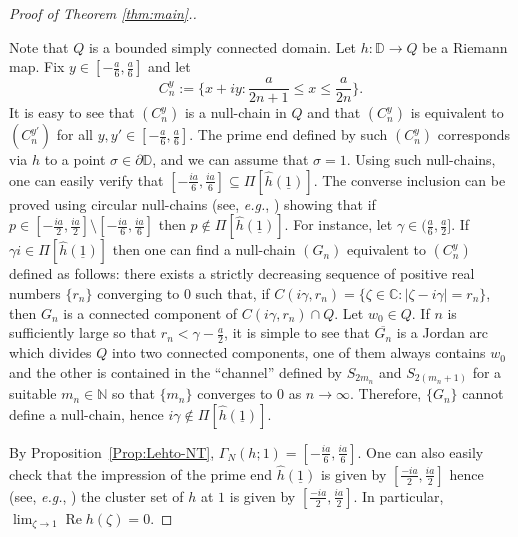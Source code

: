 \documentclass[12pt]{amsart}
\theoremstyle{definition}
\theoremstyle{remark}
\numberwithin{equation}{section}
\def\C{\mathbb C}
\def\D{\mathbb D}
\renewcommand{\Re}{\operatorname{Re}}
\begin{document}
\begin{proof}[Proof of Theorem \ref{thm:main}.]
\begin{center}
\end{center}
Note that $Q$ is a bounded simply connected domain. Let $h:\D\to Q$ be a Riemann map.  {Fix $y\in [-\frac{a}{6},\frac{a}{6}]$ }and let 
\[
C_n^y:=\{x+iy: \frac{a}{2n+1}\leq x \leq \frac{a}{2n}\}.
\]
It is easy to see that $(C_n^y)$ is a null-chain in $Q$ and that $(C_n^y)$ is equivalent to $(C_n^{y'})$ for all {$y, y'\in [-\frac{a}{6},\frac{a}{6}]$.}  The prime end defined by such $(C_n^y)$ corresponds via $h$ to a point $\sigma\in\partial \D$, and we can assume that $\sigma=1$. {Using such null-chains, one can easily verify that $[-\frac{ia}{6},\frac{ia}{6}]\subseteq \Pi[\hat{h}(\underline{1})]$. The converse inclusion can be proved using circular null-chains (see, {\sl e.g.}, \cite[Proposition~4.1.1]{BCDM}) showing that if $p\in [-\frac{ia}{2},\frac{ia}{2}]\setminus[-\frac{ia}{6},\frac{ia}{6}]$ then $p\not\in \Pi[\hat{h}(\underline{1})]$. For instance, let $\gamma\in (\frac{a}{6}, \frac{a}{2}]$. If $\gamma i\in  \Pi[\hat{h}(\underline{1})]$ then one can find a null-chain $(G_n)$ equivalent to $(C_n^y)$ defined as follows: there exists a strictly decreasing sequence of positive real numbers $\{r_n\}$ converging to $0$ such that, if $C(i\gamma, r_n)=\{\zeta\in \C: |\zeta-i\gamma|=r_n\}$, then $G_n$ is a connected component of $C(i\gamma, r_n)\cap Q$. Let $w_0\in Q$. If $n$ is sufficiently large so that $r_n<\gamma-\frac{a}{2}$, it is simple to see that $\overline{G_n}$ is a Jordan arc which divides $Q$ into two connected components, one of them always contains $w_0$ and the other is contained in the ``channel'' defined by $S_{2m_n}$ and $S_{2(m_n+1)}$ for a suitable $m_n\in \mathbb N$ so that $\{m_n\}$ converges to $0$ as $n\to \infty$. Therefore, $\{G_n\}$ cannot define a null-chain, hence $i\gamma\not\in \Pi[\hat{h}(\underline{1})]$.}

By Proposition~\ref{Prop:Lehto-NT},  $\Gamma_N(h;1)=[-\frac{ia}{6},\frac{ia}{6}]$. One can also easily check that the impression of the prime end $\hat{h}(\underline{1})$ is given by $[\frac{-ia}{2}, \frac{ia}{2}]$ hence (see, {\sl e.g.}, \cite[Proposition~4.4.4]{BCDM}) the cluster set of $h$ at $1$ is given by $[\frac{-ia}{2}, \frac{ia}{2}]$. In particular, $\lim_{\zeta\to 1}\Re h(\zeta)=0$.


\end{proof}
\end{document}
